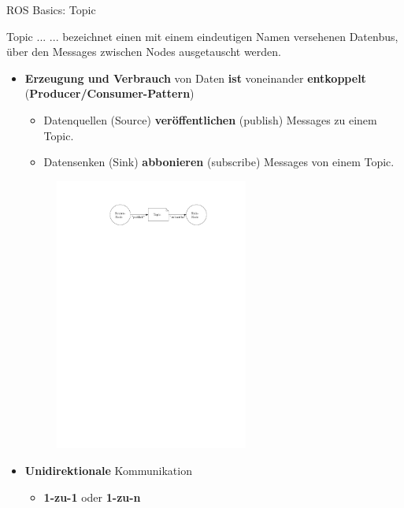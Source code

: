 \documentclass{beamer}
\begin{document}
\begin{frame}{ROS Basics: Topic}
\begin{alertblock}{Topic ...}
... bezeichnet einen mit einem eindeutigen Namen versehenen Datenbus, \"uber den Messages zwischen Nodes ausgetauscht werden.
\end{alertblock}
\begin{itemize}
	\item \textbf{Erzeugung und Verbrauch} von Daten \textbf{ist} voneinander \textbf{entkoppelt} (\textbf{Producer/Consumer-Pattern})
	\begin{itemize}
		\item Datenquellen (Source) \textbf{ver\"offentlichen} (publish) Messages zu einem Topic.
		\item Datensenken (Sink) \textbf{abbonieren} (subscribe) Messages von einem Topic.
	\end{itemize}
	\begin{figure}[H]
		\centering
		\includegraphics[width=0.6\textwidth]{./images/ros-topic.pdf}
		\label{fig:ros_topic}
	\end{figure}
	\item \textbf{Unidirektionale} Kommunikation
	\begin{itemize}
		\item \textbf{1-zu-1} oder \textbf{1-zu-n}
	\end{itemize}
\end{itemize}
\end{frame}
\end{document}
